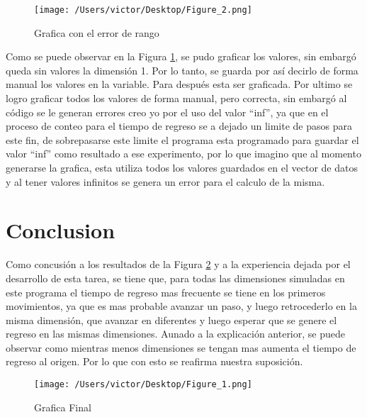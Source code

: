 \documentclass{article}
\begin{document}
\begin{figure}[H]
\begin{center}
	\texttt{[image: /Users/victor/Desktop/Figure\_2.png]}
	\caption{Grafica con el error de rango}
	\label{fig:tarea.1}
\end{center}
\end{figure}


Como se puede observar en la Figura \ref{fig:tarea.1}, se pudo graficar los valores, sin embargó queda sin valores la dimensión 1. Por lo tanto, se guarda por así decirlo de forma manual los valores en la variable. Para después esta ser graficada. Por ultimo se logro graficar todos los valores de forma manual, pero correcta, sin embargó al código se le generan errores creo yo por el uso del valor “inf”, ya que en el proceso de conteo para el tiempo de regreso se a dejado un limite de pasos para este fin, de sobrepasarse este limite el programa esta programado para guardar el valor “inf” como resultado a ese experimento, por lo que imagino que al momento generarse la grafica, esta utiliza todos los valores guardados en el vector de datos y al tener valores infinitos se genera un error para el calculo de la misma.

\section{Conclusion}



Como concusión a los resultados de la Figura \ref{fig:tarea.2} y a la experiencia dejada por el desarrollo de esta tarea, se tiene que, para todas las dimensiones simuladas en este programa el tiempo de regreso mas frecuente se tiene en los primeros movimientos, ya que es mas probable avanzar un paso, y luego retrocederlo en la misma dimensión, que avanzar en diferentes y luego esperar que se genere el regreso en las mismas dimensiones. Aunado a la explicación anterior, se puede observar como mientras menos dimensiones se tengan mas aumenta el tiempo de regreso al origen. Por lo que con esto se reafirma nuestra suposición.

\begin{figure}[H]
\begin{center}
	\texttt{[image: /Users/victor/Desktop/Figure\_1.png]}
	\caption{Grafica Final}
	\label{fig:tarea.2}
\end{center}
\end{figure}

%
%
\end{document}
